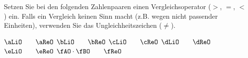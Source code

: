 Setzen Sie bei den folgenden Zahlenpaaren einen Vergleichsoperator ($>$, $=$, $<$) ein. Falls ein Vergleich keinen Sinn macht (z.B. wegen nicht passender Einheiten), verwenden Sie das Ungleichheitszeichen ($\neq$).

\begin{abcliste}
\abc $\aLiO \qquad \aReO$
\abc $\bLiO \qquad \bReO$
\abc $\cLiO \qquad \cReO$
\abc $\dLiO \qquad \dReO$
\abc $\eLiO \qquad \eReO$
\abc $\fAO\cdot\fBO \qquad \fReO$
\end{abcliste}

